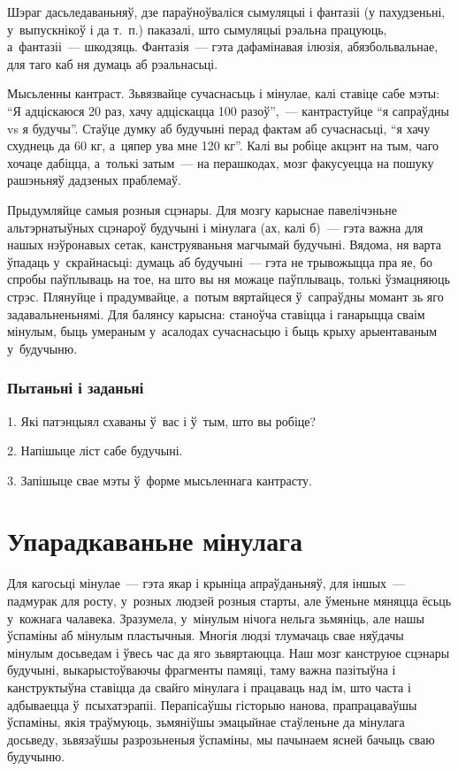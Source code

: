 Шэраг дасьледаваньняў, дзе параўноўваліся сымуляцыі і фантазіі (у пахудзеньні, у~выпускнікоў і да т.~п.) паказалі, што сымуляцыі рэальна працуюць, а~фантазіі~--- шкодзяць. Фантазія~--- гэта дафамінавая ілюзія, абязбольвальнае, для таго каб ня думаць аб рэальнасьці.

Мысьленны кантраст. Зьвязвайце сучаснасьць і мінулае, калі ставіце сабе мэты: ``Я адціскаюся 20 раз, хачу адціскацца 100 разоў'',~--- кантрастуйце ``я сапраўдны vs я будучы''. Стаўце думку аб будучыні перад фактам аб сучаснасьці, ``я хачу схуднець да 60 кг, а~цяпер ува мне 120 кг''. Калі вы робіце акцэнт на тым, чаго хочаце дабіцца, а~толькі затым~--- на перашкодах, мозг факусуецца на пошуку рашэньняў дадзеных праблемаў.

Прыдумляйце самыя розныя сцэнары. Для мозгу карыснае павелічэньне альтэрнатыўных сцэнароў будучыні і мінулага (ах, калі б)~--- гэта важна для нашых нэўронавых сетак, канструяваньня магчымай будучыні. Вядома, ня варта ўпадаць у~скрайнасьці: думаць аб будучыні~--- гэта не трывожыцца пра яе, бо спробы паўплываць на тое, на што вы ня можаце паўплываць, толькі ўзмацняюць стрэс. Плянуйце і прадумвайце, а~потым вяртайцеся ў~сапраўдны момант зь яго задавальненьнямі. Для балянсу карысна: станоўча ставіцца і ганарыцца сваім мінулым, быць умераным у~асалодах сучаснасьцю і быць крыху арыентаваным у~будучыню.

\subsubsection{Пытаньні і заданьні}

1. Які патэнцыял схаваны ў~вас і ў~тым, што вы робіце?

2. Напішыце ліст сабе будучыні.

3. Запішыце свае мэты ў~форме мысьленнага кантрасту.


\section{Упарадкаваньне мінулага}

Для кагосьці мінулае~--- гэта якар і крыніца апраўданьняў, для іншых~--- падмурак для росту, у~розных людзей розныя старты, але ўменьне мяняцца ёсьць у~кожнага чалавека. Зразумела, у~мінулым нічога нельга зьмяніць, але нашы ўспаміны аб мінулым пластычныя. Многія людзі тлумачаць свае няўдачы мінулым досьведам і ўвесь час да яго зьвяртаюцца. Наш мозг канструюе сцэнары будучыні, выкарыстоўваючы фрагменты памяці, таму важна пазітыўна і канструктыўна ставіцца да свайго мінулага і працаваць над ім, што часта і адбываецца ў~псыхатэрапіі. Перапісаўшы гісторыю нанова, прапрацаваўшы ўспаміны, якія траўмуюць, зьмяніўшы эмацыйнае стаўленьне да мінулага досьведу, зьвязаўшы разрозьненыя ўспаміны, мы пачынаем ясней бачыць сваю будучыню.

